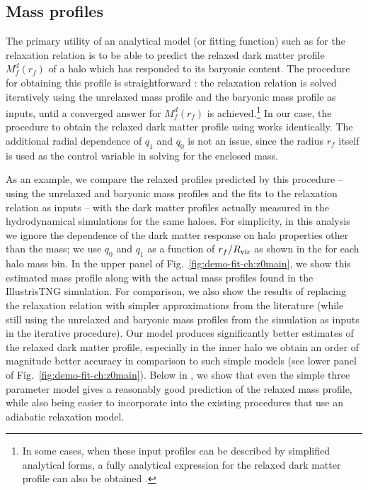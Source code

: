 \subsection{Mass profiles}
\label{sec:mass-prof-demo-ch:z0main}
The primary utility of an analytical model (or fitting function) such as  for the relaxation relation is to be able to predict the relaxed dark matter profile $M_f^d(r_f)$ of a halo which has responded to its baryonic content. The procedure for obtaining this profile is straightforward \citep[see, e.g., Appendix A of][]{2021MNRAS.503.4147P}: the relaxation relation is solved iteratively using the unrelaxed mass profile and the baryonic mass profile as inputs, until a converged answer for $M_f^d(r_f)$ is achieved.\footnote{In some cases, when these input profiles can be described by simplified analytical forms, a fully analytical expression for the relaxed dark matter profile can also be obtained \citep[see, e.g., Appendix A of][]{2021MNRAS.507..632P}.} In our case, the procedure to obtain the relaxed dark matter profile using  works identically. The additional radial dependence of $q_1$ and $q_0$ is not an issue, since the radius $r_f$ itself is used as the control variable in solving for the enclosed mass.


As an example, we compare the relaxed profiles predicted by this procedure -- using the unrelaxed and baryonic mass profiles and the fits to the relaxation relation  as inputs -- with the dark matter profiles actually measured in the hydrodynamical simulations for the same haloes.
For simplicity, in this analysis we ignore the dependence of the dark matter response on halo properties other than the mass;
we use $q_0$ and $q_1$ as a function of $r_f/R_{\rm{vir}}$ as shown in the  for each halo mass bin. In the upper panel of Fig.~\ref{fig:demo-fit-ch:z0main}, we show this estimated mass profile along with the actual mass profiles found in the IllustrisTNG simulation.
For comparison, we also show the results of replacing the relaxation relation with simpler approximations from the literature (while still using the unrelaxed and baryonic mass profiles from the simulation as inputs in the iterative procedure).
Our model produces significantly better estimates of the relaxed dark matter profile, especially in the inner halo we obtain an order of magnitude better accuracy in comparison to such simple models (see lower panel of Fig.~\ref{fig:demo-fit-ch:z0main}). Below in , we show that even the simple three parameter model gives a reasonably good prediction of the relaxed mass profile, while also being easier to incorporate into the existing procedures that use an adiabatic relaxation model. 

